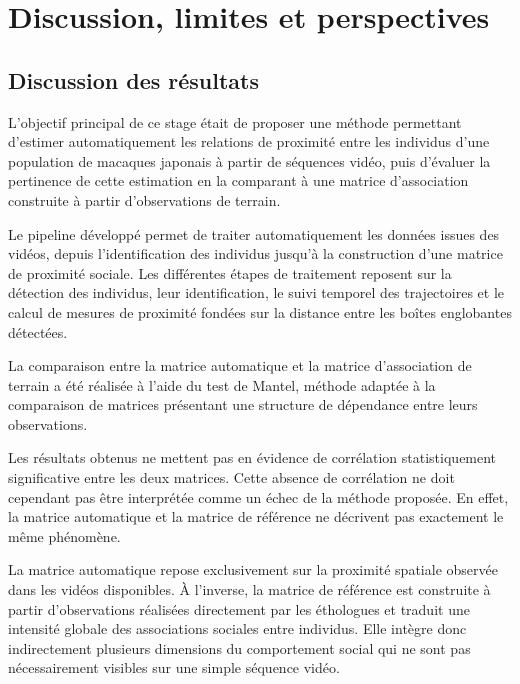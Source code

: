 \documentclass[11pt,a4paper]{report}
\begin{document}

\chapter{Discussion, limites et perspectives}
\label{chap:discussion}

\section{Discussion des résultats}

L'objectif principal de ce stage était de proposer une méthode permettant
d'estimer automatiquement les relations de proximité entre les individus
d'une population de macaques japonais à partir de séquences vidéo, puis
d'évaluer la pertinence de cette estimation en la comparant à une matrice
d'association construite à partir d'observations de terrain.

Le pipeline développé permet de traiter automatiquement les données
issues des vidéos, depuis l'identification des individus jusqu'à la
construction d'une matrice de proximité sociale. Les différentes étapes
de traitement reposent sur la détection des individus, leur
identification, le suivi temporel des trajectoires et le calcul de
mesures de proximité fondées sur la distance entre les boîtes
englobantes détectées.

La comparaison entre la matrice automatique et la matrice d'association
de terrain a été réalisée à l'aide du test de Mantel, méthode adaptée à
la comparaison de matrices présentant une structure de dépendance entre
leurs observations.

Les résultats obtenus ne mettent pas en évidence de corrélation
statistiquement significative entre les deux matrices. Cette absence de
corrélation ne doit cependant pas être interprétée comme un échec de la
méthode proposée. En effet, la matrice automatique et la matrice de
référence ne décrivent pas exactement le même phénomène.

La matrice automatique repose exclusivement sur la proximité spatiale
observée dans les vidéos disponibles. À l'inverse, la matrice de
référence est construite à partir d'observations réalisées directement
par les éthologues et traduit une intensité globale des associations
sociales entre individus. Elle intègre donc indirectement plusieurs
dimensions du comportement social qui ne sont pas nécessairement visibles
sur une simple séquence vidéo.
\end{document}
